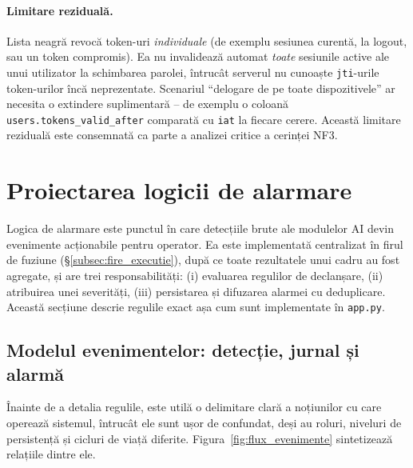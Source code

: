 \documentclass[../../main.tex]{subfiles}
\begin{document}
\paragraph*{Limitare reziduală.} Lista neagră revocă token-uri \emph{individuale} (de exemplu sesiunea curentă, la logout, sau un token compromis). Ea nu invalidează automat \emph{toate} sesiunile active ale unui utilizator la schimbarea parolei, întrucât serverul nu cunoaște \texttt{jti}-urile token-urilor încă neprezentate. Scenariul ``delogare de pe toate dispozitivele'' ar necesita o extindere suplimentară -- de exemplu o coloană \texttt{users.tokens\_valid\_after} comparată cu \texttt{iat} la fiecare cerere. Această limitare reziduală este consemnată ca parte a analizei critice a cerinței NF3.

\section{Proiectarea logicii de alarmare}
\label{sec:logica_alarme}

Logica de alarmare este punctul în care detecțiile brute ale modulelor AI devin evenimente acționabile pentru operator. Ea este implementată centralizat în firul de fuziune (\S\ref{subsec:fire_executie}), după ce toate rezultatele unui cadru au fost agregate, și are trei responsabilități: (i) evaluarea regulilor de declanșare, (ii) atribuirea unei severități, (iii) persistarea și difuzarea alarmei cu deduplicare. Această secțiune descrie regulile exact așa cum sunt implementate în \texttt{app.py}.

\subsection{Modelul evenimentelor: detecție, jurnal și alarmă}
\label{subsec:model_evenimente}

Înainte de a detalia regulile, este utilă o delimitare clară a noțiunilor cu care operează sistemul, întrucât ele sunt ușor de confundat, deși au roluri, niveluri de persistență și cicluri de viață diferite. Figura~\ref{fig:flux_evenimente} sintetizează relațiile dintre ele.
\end{document}
